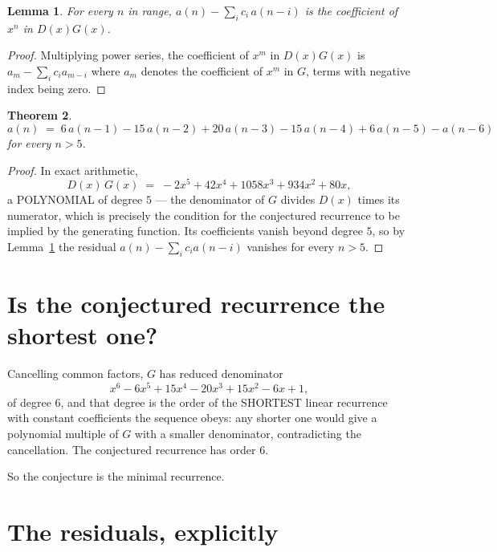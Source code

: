 \documentclass[11pt,a4paper]{article}
\theoremstyle{plain}
\newtheorem{theorem}{Theorem}
\newtheorem{lemma}[theorem]{Lemma}
\theoremstyle{definition}
\begin{document}
\begin{lemma}\label{lem:key}
For every $n$ in range, $a(n)-\sum_i c_i\,a(n-i)$ is the coefficient of $x^{n}$ in
$D(x)G(x)$.
\end{lemma}

\begin{proof}
Multiplying power series, the coefficient of $x^{m}$ in $D(x)G(x)$ is
$a_m-\sum_i c_i a_{m-i}$ where $a_m$ denotes the coefficient of $x^{m}$ in $G$, terms with
negative index being zero.
\end{proof}

\begin{theorem}
\[
a(n)\;=\;6\,a(n-1) - 15\,a(n-2) + 20\,a(n-3) - 15\,a(n-4) + 6\,a(n-5) - a(n-6)
\]
for every $n>5$.
\end{theorem}

\begin{proof}
In exact arithmetic,
\[
D(x)\,G(x)\;=\;- 2 x^{5} + 42 x^{4} + 1058 x^{3} + 934 x^{2} + 80 x,
\]
a POLYNOMIAL of degree $5$ --- the denominator of $G$ divides $D(x)$ times its numerator,
which is precisely the condition for the conjectured recurrence to be implied by the
generating function. Its coefficients vanish beyond degree $5$, so by
Lemma~\ref{lem:key} the residual $a(n)-\sum_ic_ia(n-i)$ vanishes for every
$n>5$.
\end{proof}

\section{Is the conjectured recurrence the shortest one?}

Cancelling common factors, $G$ has reduced denominator
\[
x^{6} - 6 x^{5} + 15 x^{4} - 20 x^{3} + 15 x^{2} - 6 x + 1,
\]
of degree $6$, and that degree is the order of the SHORTEST linear recurrence with
constant coefficients the sequence obeys: any shorter one would give a polynomial multiple of
$G$ with a smaller denominator, contradicting the cancellation. The conjectured recurrence has
order $6$.

So the conjecture is the minimal recurrence.

\section{The residuals, explicitly}
\end{document}
